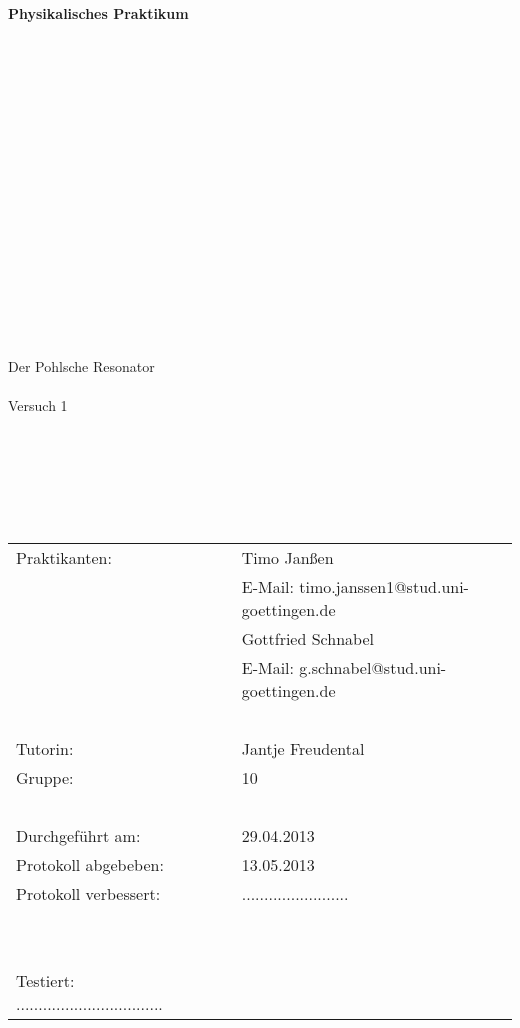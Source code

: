 \begin{center}
    {\Huge{\textbf{Physikalisches Praktikum}}}\\[16pt]
\ \\
\ \\
\ \\
\ \\
\ \\
\ \\
\ \\
\ \\
\ \\
\ \\
\ \\
\ \\
\ \\
\ \\
\ \\
\ \\
\ \\
\huge{Der Pohlsche Resonator}
\ \\
\ \\
\large{Versuch 1}
\end{center}

\normalsize
\ \\
\ \\
\ \\
\ \\
\ \\

\begin{center}
\begin{tabular}{lcl}
      Praktikanten: & ~ & Timo Janßen \\
                    & ~ & E-Mail: timo.janssen1@stud.uni-goettingen.de \\
		    & ~ & Gottfried Schnabel \\
		    & ~ & E-Mail: g.schnabel@stud.uni-goettingen.de \\
\ \\		    
      Tutorin: & ~ & Jantje Freudental \\
      Gruppe: & ~ & 10 \\
\ \\      
      Durchgeführt am: & ~ & 29.04.2013 \\
      Protokoll abgebeben: & ~ & 13.05.2013 \\
      Protokoll verbessert: & ~ & ........................\\
\ \\
\ \\
      Testiert: .................................    
\end{tabular}\\
\end{center}
